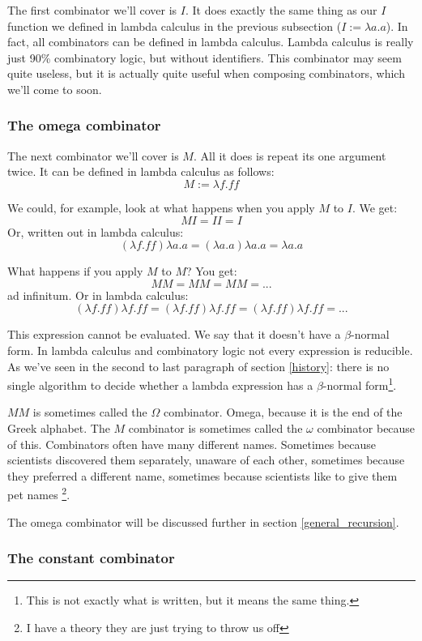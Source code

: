 \documentclass[11pt]{article}
\begin{document}
The first combinator we'll cover is \(I\). It does exactly the same thing as
our \(I\) function we defined in lambda calculus in the previous subsection
(\(I:=\lambda a.a\)). In fact, all combinators can be defined in lambda
calculus. Lambda calculus is really just 90\% combinatory logic, but without
identifiers. This combinator may seem quite useless, but it is actually quite
useful when composing combinators, which we'll come to soon.

\subsubsection{The omega combinator}\label{omega}

The next combinator we'll cover is \(M\). All it does is repeat its one
argument twice. It can be defined in lambda calculus as follows:
\[M:=\lambda f.ff\]

We could, for example, look at what happens when you apply \(M\) to \(I\). We
get:
\[M I = I I = I\]
Or, written out in lambda calculus:
\[(\lambda f.ff)\lambda a.a=(\lambda a.a)\lambda a.a=\lambda a.a\]

What happens if you apply \(M\) to \(M\)? You get:
\[M M = M M = M M = ...\]
ad infinitum. Or in lambda calculus:
\[(\lambda f.ff)\lambda f.ff=(\lambda f.ff)\lambda f.ff=(\lambda f.ff)\lambda f.ff=...\]

This expression cannot be evaluated. We say that it doesn't have a
\(\beta\)-normal form. In lambda calculus and combinatory logic not every
expression is reducible. As we've seen in the second to last paragraph of
section \ref{history}: there is no single algorithm to decide whether a lambda
expression has a \(\beta\)-normal form\footnote{This is not exactly what is
written, but it means the same thing.}.

\(M M\) is sometimes called the \(\Omega\) combinator. Omega, because it is the
end of the Greek alphabet. The \(M\) combinator is sometimes called the
\(\omega\) combinator because of this. Combinators often have many different
names. Sometimes because scientists discovered them separately, unaware of each
other, sometimes because they preferred a different name, sometimes because
scientists like to give them pet names \footnote{I have a theory they are just
trying to throw us off}.

The omega combinator will be discussed further in section
\ref{general_recursion}.

\subsubsection{The constant combinator}\label{constant}
\end{document}
